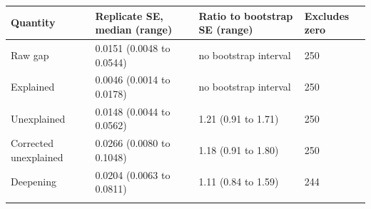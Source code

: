 \setlength{\tabcolsep}{3pt}
\begin{tabular}{@{}llll@{}}
\toprule
Quantity & Replicate SE, median (range) & Ratio to bootstrap SE (range) & Excludes zero\\
\midrule
Raw gap & 0.0151 (0.0048 to 0.0544) & no bootstrap interval & 250\\
Explained & 0.0046 (0.0014 to 0.0178) & no bootstrap interval & 250\\
Unexplained & 0.0148 (0.0044 to 0.0562) & 1.21 (0.91 to 1.71) & 250\\
Corrected unexplained & 0.0266 (0.0080 to 0.1048) & 1.18 (0.91 to 1.80) & 250\\
Deepening & 0.0204 (0.0063 to 0.0811) & 1.11 (0.84 to 1.59) & 244\\
\botrule
\end{tabular}
